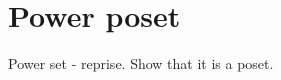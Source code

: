 \section{Power poset}

\begin{publictodo}
    Power set - reprise. Show that it is a poset.
\end{publictodo}